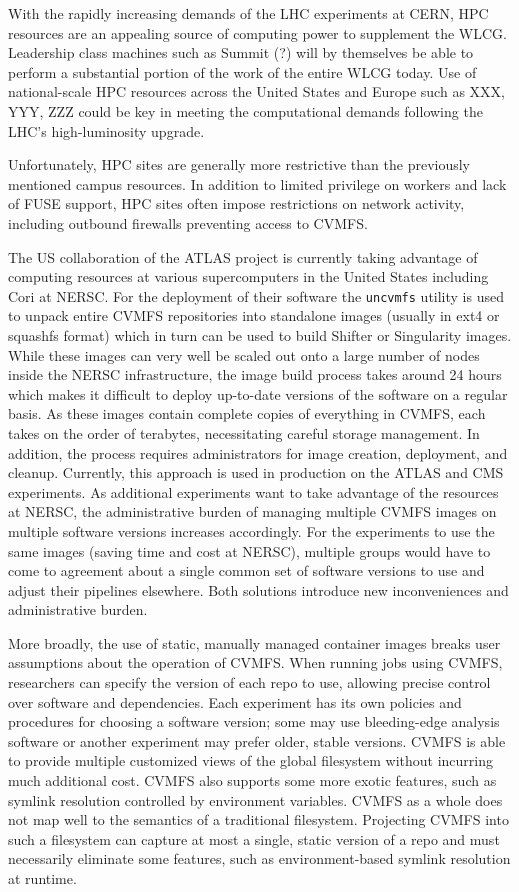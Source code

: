 \documentclass[sigconf]{acmart}
\begin{document}
With the rapidly increasing demands of the LHC experiments at CERN,
HPC resources are an appealing source of computing power to supplement the WLCG.
Leadership class machines such as Summit (?) will by themselves be able to perform a substantial portion of the work of the entire WLCG today.
Use of national-scale HPC resources across the United States and Europe such as XXX, YYY, ZZZ could be key in meeting the computational demands following the LHC's high-luminosity upgrade.

Unfortunately, HPC sites are generally more restrictive than the previously mentioned campus resources.
In addition to limited privilege on workers and lack of FUSE support,
HPC sites often impose restrictions on network activity,
including outbound firewalls preventing access to CVMFS.

The US collaboration of the ATLAS project is currently taking advantage of computing resources at various supercomputers in the United States including Cori at NERSC.
For the deployment of their software the \texttt{uncvmfs} utility is used to unpack entire CVMFS repositories into standalone images (usually in ext4 or squashfs format) which in turn can be used to build Shifter or Singularity images.
While these images can very well be scaled out onto a large number of nodes inside the NERSC infrastructure,
the image build process takes around 24 hours which makes it difficult to deploy up-to-date versions of the software on a regular basis.
As these images contain complete copies of everything in CVMFS,
each takes on the order of terabytes,
necessitating careful storage management.
In addition, the process requires administrators for image creation, deployment, and cleanup.
Currently, this approach is used in production on the ATLAS and CMS experiments.
As additional experiments want to take advantage of the resources at NERSC,
the administrative burden of managing multiple CVMFS images on multiple software versions increases accordingly.
For the experiments to use the same images (saving time and cost at NERSC),
multiple groups would have to come to agreement about a single common set of software versions to use and adjust their pipelines elsewhere.
Both solutions introduce new inconveniences and administrative burden.

More broadly, the use of static, manually managed container images breaks user assumptions about the operation of CVMFS.
When running jobs using CVMFS,
researchers can specify the version of each repo to use,
allowing precise control over software and dependencies.
Each experiment has its own policies and procedures for choosing a software version;
some may use bleeding-edge analysis software or another experiment may prefer older, stable versions.
CVMFS is able to provide multiple customized views of the global filesystem without incurring much additional cost.
CVMFS also supports some more exotic features,
such as symlink resolution controlled by environment variables.
CVMFS as a whole does not map well to the semantics of a traditional filesystem.
Projecting CVMFS into such a filesystem can capture at most a single, static version of a repo and must necessarily eliminate some features,
such as environment-based symlink resolution at runtime.
\end{document}
